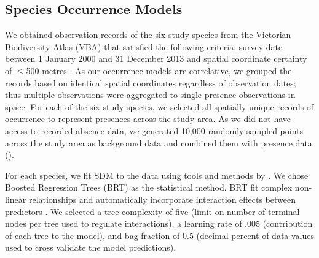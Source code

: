 \subsection{Species Occurrence Models}

We obtained observation records of the six study species from the Victorian Biodiversity Atlas (VBA) that satisfied the following criteria: survey date between 1 January 2000 and 31 December 2013 and spatial coordinate certainty of $\leq$500 metres \citep{depi16}.  As our occurrence models are correlative, we grouped the records based on identical spatial coordinates regardless of observation dates; thus multiple observations were aggregated to single presence observations in space. For each of the six study species, we selected all spatially unique records of occurrence to represent presences across the study area. As we did not have access to recorded absence data, we generated 10,000 randomly sampled points across the study area as background data and combined them with presence data ().

For each species, we fit SDM to the data using tools and methods by \cite{elit09}. We chose Boosted Regression Trees (BRT) \citep{frie02} as the statistical method. BRT fit complex non-linear relationships and automatically incorporate interaction effects between predictors \citep{elit08}. We selected a tree complexity of five (limit on number of terminal nodes per tree used to regulate interactions), a learning rate of .005 (contribution of each tree to the model), and bag fraction of 0.5 (decimal percent of data values used to cross validate the model predictions).

